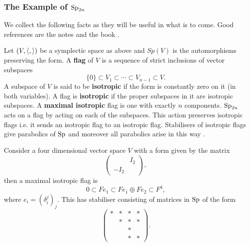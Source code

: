 \subsubsection{The Example of \(\operatorname{Sp}_{2n}\)}
We collect the following facts as they will be useful in what is to come. Good references are the notes \cite{conradStandardParabolicSubgroups} and the book \cite[\S 8]{BuildingsClassicalGroups}. 

Let \((V, \langle ,\rangle)\) be a symplectic space as above and \(Sp(V)\) is the automorphisms preserving the form. A \textbf{flag} of \(V\) is a sequence of strict inclusions of vector subspaces 
\[\{0\}\subset V_1 \subset \cdots \subset V_{n-1} \subset V. \]
A subspace of \(V\) is said to be \textbf{isotropic} if the form is constantly zero on it (in both variables). A flag is \textbf{isotropic} if the proper subspaces in it are isotropic subspaces. A \textbf{maximal isotropic} flag is one with exactly \(n\) components. \(\operatorname{Sp}_{2n}\) acts on a flag by acting on each of the subspaces. This action preserves isotropic flags i.e. it sends an isotropic flag to an isotropic flag. Stabilisers of isotropic flags give parabolics of \(\operatorname{Sp}\) and moreover all parabolics arise in this way \cite[Exercise 3.2.16, 6.2.11]{springerLinearAlgebraicGroups1998}.

\begin{example}
        Consider a four dimensional vector space \(V\) with a form given by the matrix
        \[\begin{pmatrix}
            & I_2 \\
            -I_2 & 
        \end{pmatrix},\]
        then a maximal isotropic flag is 
        \[0 \subset Fe_1 \subset Fe_1 \oplus Fe_2 \subset F^4,\]
        where \(e_i = (\delta_i^j)_j\). This has stabiliser consisting of matrices in \(\operatorname{Sp}\) of the form
        \[\begin{pmatrix}
            *&*&*&* \\
             &*&*&* \\
             && *& \\
             && *& *
        \end{pmatrix}.\]
    \end{example}

